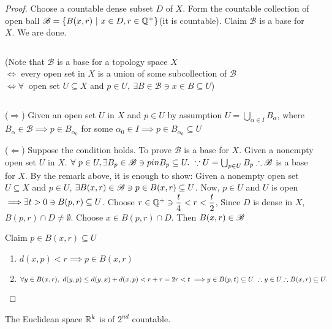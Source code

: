 \begin{proof}
	Choose a countable dense subset $D$ of $X$. Form the countable collection of open ball $\mathscr{B} = \{B(x,r)~|~ x \in D,r\in \mathbb{Q}^+\}$(it is countable). Claim $\mathscr B$ is a base for $X$. We are done.
	
	$ $
	
	(Note that $\mathscr B$ is a base for a topology space $X$\\$\Leftrightarrow$ every open set in $X$ is a union of some subcollection of $\mathscr B$\\$\Leftrightarrow \forall~$ open set $U \subseteq X$ and $p \in U,~\exists B \in \mathscr B \ni x \in B \subseteq U$) 
	
	$ $
	
	($\Rightarrow$) Given an open set $U$ in $X$ and $p \in U$ by assumption $U = \bigcup_{\alpha \in I}B_{\alpha}$, where $B_{\alpha} \in \mathscr B \implies p \in B_{\alpha_0}$ for some $\alpha_0 \in I \implies p \in B_{\alpha_0} \subseteq U$
	
	($\Leftarrow$) Suppose the condition holds. To prove $\mathscr B$ is a base for $X$. Given a nonempty open set $U$ in $X$. $\forall~p \in U,\exists B_p \in \mathscr B \ni p in B_p \subseteq U.\\~\because U = \bigcup_{p \in U}B_p \therefore \mathscr B$ is a base for $X$. By the remark above, it is enough to show: Given a nonempty open set $U \subseteq X$ and $p \in U$, $\exists B(x,r) \in \mathscr{B} \ni p \in B(x,r) \subseteq U$. Now, $p \in U$ and $U$ is open $\implies \\ \exists t > 0 \ni B(p,r) \subseteq U$. Choose $r \in \mathbb{Q}^+ \ni \dfrac{t}{4} < r < \dfrac{t}{2}$, Since $D$ is dense in $X$, $B(p,r) \cap D \neq \emptyset$. Choose $x \in B(p,r) \cap D$. Then $B(x,r) \in \mathscr{B}$
	\newpage
	
	Claim $p \in B(x,r) \subseteq U$
	
	\begin{enumerate}[wide,label=$\bullet$]
		\item $d(x,p)<r \implies p \in B(x,r)$
		\item $\forall y \in B(x,r),~d(y,p) \leq d(y,x) + d(x,p) < r+r = 2r < t \implies \\ y \in B(p,t) \subseteq U~\therefore y \in U \therefore B(x,r) \subseteq U.$
	\end{enumerate}
\end{proof}



\begin{cor}
	The Euclidean space $\mathbb{R}^k$ is of $2^{nd}$ countable.
\end{cor}

